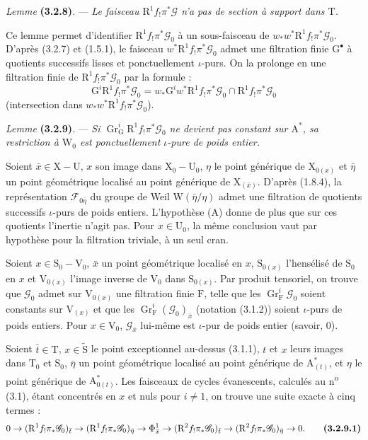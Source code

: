 \documentclass[11pt,leqno]{article}
\begin{document}
\textit{Lemme} \textbf{(3.2.8)}. — \textit{Le faisceau \(\mathrm{R}^1f_!\pi^*\mathscr{G}\) n’a pas de section à support dans \(\mathrm{T}\).}

Ce lemme permet d’identifier \(\mathrm{R}^1f_!\pi^*\mathscr{G}_0\) à un sous-faisceau de \(w_*w^*\mathrm{R}^1f_!\pi^*\mathscr{G}_0\). D’après (3.2.7) et (1.5.1), le faisceau \(w^*\mathrm{R}^1f_!\pi^*\mathscr{G}_0\) admet une filtration finie \(\mathrm{G}^\bullet\) à quotients successifs lisses et ponctuellement \(\iota\)-purs. On la prolonge en une filtration finie de \(\mathrm{R}^1f_!\pi^*\mathscr{G}_0\) par la formule :
\[
\mathrm{G}^i\mathrm{R}^1f_!\pi^*\mathscr{G}_0
=w_*\mathrm{G}^iw^*\mathrm{R}^1f_!\pi^*\mathscr{G}_0
\cap\mathrm{R}^1f_!\pi^*\mathscr{G}_0
\]
(intersection dans \(w_*w^*\mathrm{R}^1f_!\pi^*\mathscr{G}_0\)).

\textit{Lemme} \textbf{(3.2.9)}. — \textit{Si \(\operatorname{Gr}_{\mathrm{G}}^i\mathrm{R}^1f_!\pi^*\mathscr{G}_0\) ne devient pas constant sur \(\mathrm{A}^*\), sa restriction à \(\mathrm{W}_0\) est ponctuellement \(\iota\)-pure de poids entier.}

Soient \(\bar{x}\in\mathrm{X}-\mathrm{U}\), \(x\) son image dans \(\mathrm{X}_0-\mathrm{U}_0\), \(\eta\) le point générique de \(\mathrm{X}_{0(x)}\) et \(\bar{\eta}\) un point géométrique localisé au point générique de \(\mathrm{X}_{(\bar{x})}\). D’après (1.8.4), la représentation \(\mathscr{F}_{0\bar{\eta}}\) du groupe de Weil \(\mathrm{W}(\bar{\eta}/\eta)\) admet une filtration de quotients successifs \(\iota\)-purs de poids entiers. L’hypothèse (A) donne de plus que sur ces quotients l’inertie n’agit pas. Pour \(x\in\mathrm{U}_0\), la même conclusion vaut par hypothèse pour la filtration triviale, à un seul cran.

Soient \(x\in\mathrm{S}_0-\mathrm{V}_0\), \(\bar{x}\) un point géométrique localisé en \(x\), \(\mathrm{S}_{0(x)}\) l’hensélisé de \(\mathrm{S}_0\) en \(x\) et \(\mathrm{V}_{0(x)}\) l’image inverse de \(\mathrm{V}_0\) dans \(\mathrm{S}_{0(x)}\). Par produit tensoriel, on trouve que \(\mathscr{G}_0\) admet sur \(\mathrm{V}_{0(x)}\) une filtration finie \(\mathrm{F}\), telle que les \(\operatorname{Gr}_{\mathrm{F}}^i\mathscr{G}_0\) soient constants sur \(\mathrm{V}_{(x)}\) et que les \(\operatorname{Gr}_{\mathrm{F}}^i(\mathscr{G}_0)_{\bar{x}}\) (notation (3.1.2)) soient \(\iota\)-purs de poids entiers. Pour \(x\in\mathrm{V}_0\), \(\mathscr{G}_{\bar{x}}\) lui-même est \(\iota\)-pur de poids entier (savoir, \(0\)).

Soient \(\bar{t}\in\mathrm{T}\), \(x\in\widetilde{\mathrm{S}}\) le point exceptionnel au-dessus (3.1.1), \(t\) et \(x\) leurs images dans \(\mathrm{T}_0\) et \(\mathrm{S}_0\), \(\bar{\eta}\) un point géométrique localisé au point générique de \(\mathrm{A}_{(t)}^*\), et \(\eta\) le point générique de \(\mathrm{A}_{0(t)}^*\). Les faisceaux de cycles évanescents, calculés au n\textsuperscript{o} (3.1), étant concentrés en \(x\) et nuls pour \(i\neq1\), on trouve une suite exacte à cinq termes :
\[
0\to(\mathrm{R}^1f_!\pi_*\mathscr{G}_0)_{\bar{t}}
\to(\mathrm{R}^1f_!\pi_*\mathscr{G}_0)_{\bar{\eta}}
\to\Phi_{\bar{x}}^1
\to(\mathrm{R}^2f_!\pi_*\mathscr{G}_0)_{\bar{t}}
\to(\mathrm{R}^2f_!\pi_*\mathscr{G}_0)_{\bar{\eta}}\to0.
\tag*{\textbf{(3.2.9.1)}}
\]
\end{document}
